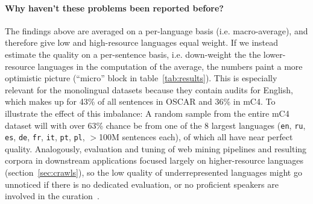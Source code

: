 \paragraph{Why haven't these problems been reported before?}
The findings above are averaged on a per-language basis (i.e. macro-average), and therefore give low and high-resource languages equal weight. If we instead estimate the quality on a per-sentence basis, i.e. down-weight the the lower-resource languages in the computation of the average, the numbers paint a more optimistic picture (``micro'' block in table~\ref{tab:results}). This is especially relevant for the monolingual datasets because they contain audits for English, which makes up for 43\% of all sentences in OSCAR and 36\% in mC4. To illustrate the effect of this imbalance: A random sample from the entire mC4 dataset will with over 63\% chance be from one of the 8 largest languages (\texttt{en}, \texttt{ru}, \texttt{es}, \texttt{de}, \texttt{fr}, \texttt{it}, \texttt{pt}, \texttt{pl}, $>$100M sentences each),%
of which all have near perfect quality. Analogously, evaluation and tuning of web mining pipelines and resulting corpora in downstream applications focused largely on higher-resource languages (section~\ref{sec:crawls}), so the low quality of underrepresented languages might go unnoticed if there is no dedicated evaluation, or no proficient speakers are involved in the curation~\citep{masakhane}.


